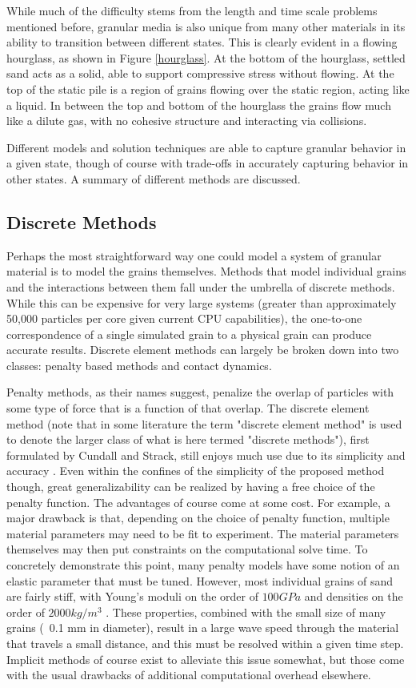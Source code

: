 While much of the difficulty stems from the length and time scale problems mentioned before, granular media is also unique from many other materials in its ability to transition between different states. This is clearly evident in a flowing hourglass, as shown in Figure \ref{hourglass}. At the bottom of the hourglass, settled sand acts as a solid, able to support compressive stress without flowing. At the top of the static pile is a region of grains flowing over the static region, acting like a liquid. In between the top and bottom of the hourglass the grains flow much like a dilute gas, with no cohesive structure and interacting via collisions.

Different models and solution techniques are able to capture granular behavior in a given state, though of course with trade-offs in accurately capturing behavior in other states. A summary of different methods are discussed. 

\subsection{Discrete Methods}
Perhaps the most straightforward way one could model a system of granular material is to model the grains themselves. Methods that model individual grains and the interactions between them fall under the umbrella of discrete methods. While this can be expensive for very large systems (greater than approximately 50,000 particles per core given current CPU capabilities), the one-to-one correspondence of a single simulated grain to a physical grain can produce accurate results. Discrete element methods can largely be broken down into two classes: penalty based methods and contact dynamics.

Penalty methods, as their names suggest, penalize the overlap of particles with some type of force that is a function of that overlap. The discrete element method (note that in some literature the term "discrete element method" is used to denote the larger class of what is here termed "discrete methods"), first formulated by Cundall and Strack, still enjoys much use due to its simplicity and accuracy \cite{Cundall:1979}. Even within the confines of the simplicity of the proposed method though, great generalizability can be realized by having a free choice of the penalty function. The advantages of course come at some cost. For example, a major drawback is that, depending on the choice of penalty function, multiple material parameters may need to be fit to experiment. The material parameters themselves may then put constraints on the computational solve time. To concretely demonstrate this point, many penalty models have some notion of an elastic parameter that must be tuned. However, most individual grains of sand are fairly stiff, with Young's moduli on the order of $100 GPa$ and densities on the order of $2000 kg/m^3$ \cite{Wang:2010}. These properties, combined with the small size of many grains (~0.1 mm in diameter), result in a large wave speed through the material that travels a small distance, and this must be resolved within a given time step. Implicit methods of course exist to alleviate this issue somewhat, but those come with the usual drawbacks of additional computational overhead elsewhere.

